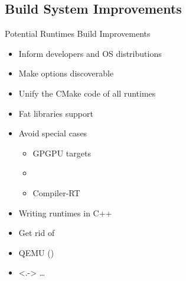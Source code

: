 \subsection{Build System Improvements}
\begin{frame}{Potential Runtimes Build Improvements}
\begin{itemize}
\item<+-> Inform \LLVM developers and OS distributions
\item<+-> Make  options discoverable
\item<+-> Unify the CMake code of all runtimes
\item<+-> Fat libraries support
\item<+-> Avoid special cases
     \begin{itemize}
     \item GPGPU targets
     \item {}
     \item Compiler-RT 
     \end{itemize}

\item<+-> Writing runtimes in C++
\item<+-> Get rid of 
\item<+-> QEMU ()
\item<.-> \dots
\end{itemize}
\end{frame}

